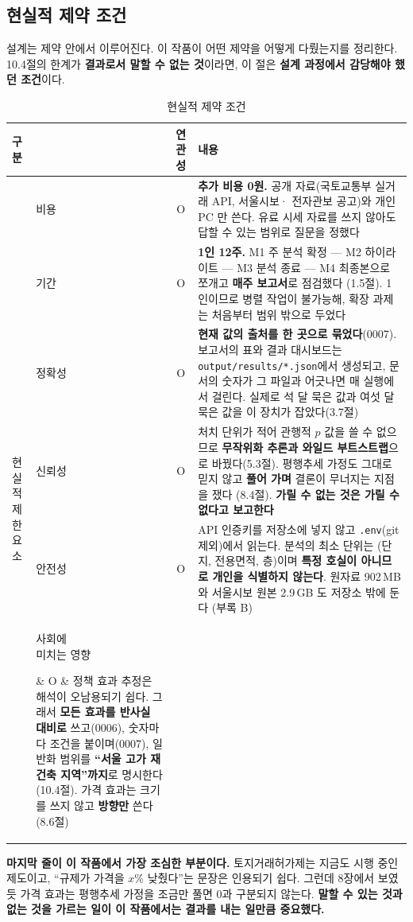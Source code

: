 
\subsection{현실적 제약 조건}

설계는 제약 안에서 이루어진다. 이 작품이 어떤 제약을 어떻게 다뤘는지를 정리한다.
10.4절의 한계가 \textbf{결과로서 말할 수 없는 것}이라면, 이 절은 \textbf{설계
과정에서 감당해야 했던 조건}이다.

\begin{table}[htbp]
  \centering
  \caption{현실적 제약 조건}
  \label{tab:v2-constraint}
  \begin{tabular}{llcp{8.6cm}}
    \toprule
    \textbf{구분} & & \textbf{연관성} & \textbf{내용} \\
    \midrule
    \multirow{6}{*}{\parbox{1.6cm}{현실적\\제한요소}}
      & 비용 & O &
        \textbf{추가 비용 0원.} 공개 자료(국토교통부 실거래 API, 서울시보·
        전자관보 공고)와 개인 PC 만 쓴다. 유료 시세 자료를 쓰지 않아도
        답할 수 있는 범위로 질문을 정했다 \\
    \cmidrule(l){2-4}
      & 기간 & O &
        \textbf{1인 12주.} M1 주 분석 확정 --- M2 하이라이트 --- M3 분석
        종료 --- M4 최종본으로 쪼개고 \textbf{매주 보고서}로 점검했다
        (1.5절). 1인이므로 병렬 작업이 불가능해, 확장 과제는 처음부터
        범위 밖으로 두었다 \\
    \cmidrule(l){2-4}
      & 정확성 & O &
        \textbf{현재 값의 출처를 한 곳으로 묶었다}(0007). 보고서의 표와
        결과 대시보드는 \texttt{output/results/*.json}에서 생성되고,
        문서의 숫자가 그 파일과 어긋나면 매 실행에서 걸린다. 실제로 석 달
        묵은 값과 여섯 달 묵은 값을 이 장치가 잡았다(3.7절) \\
    \cmidrule(l){2-4}
      & 신뢰성 & O &
        처치 단위가 적어 관행적 $p$ 값을 쓸 수 없으므로 \textbf{무작위화
        추론과 와일드 부트스트랩}으로 바꿨다(5.3절). 평행추세 가정도
        그대로 믿지 않고 \textbf{풀어 가며} 결론이 무너지는 지점을 쟀다
        (8.4절). \textbf{가릴 수 없는 것은 가릴 수 없다고 보고한다} \\
    \cmidrule(l){2-4}
      & 안전성 & O &
        API 인증키를 저장소에 넣지 않고 \texttt{.env}(git 제외)에서 읽는다.
        분석의 최소 단위는 (단지, 전용면적, 층)이며 \textbf{특정 호실이
        아니므로 개인을 식별하지 않는다}. 원자료 902\,MB 와 서울시보 원본
        2.9\,GB 도 저장소 밖에 둔다 (부록 B) \\
    \cmidrule(l){2-4}
      & \parbox{2.2cm}{사회에\\미치는 영향} & O &
        정책 효과 추정은 해석이 오남용되기 쉽다. 그래서 \textbf{모든 효과를
        반사실 대비로} 쓰고(0006), 숫자마다 조건을 붙이며(0007), 일반화
        범위를 \textbf{``서울 고가 재건축 지역''까지}로 명시한다(10.4절).
        가격 효과는 크기를 쓰지 않고 \textbf{방향만} 쓴다(8.6절) \\
    \bottomrule
  \end{tabular}
\end{table}

\textbf{마지막 줄이 이 작품에서 가장 조심한 부분이다.} 토지거래허가제는 지금도
시행 중인 제도이고, ``규제가 가격을 $x$\% 낮췄다''는 문장은 인용되기 쉽다. 그런데
8장에서 보였듯 가격 효과는 평행추세 가정을 조금만 풀면 0과 구분되지 않는다.
\textbf{말할 수 있는 것과 없는 것을 가르는 일이 이 작품에서는 결과를 내는 일만큼
중요했다.}
